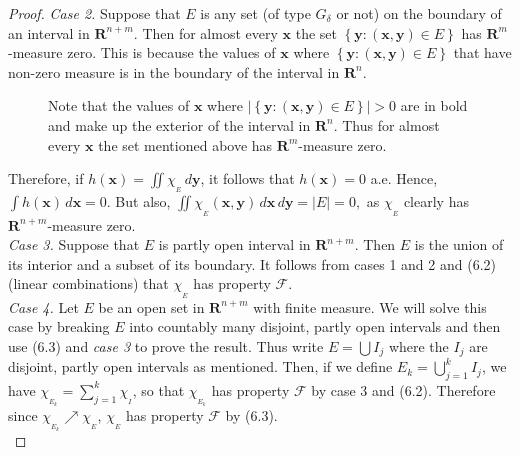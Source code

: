 \documentclass[12pt]{book}
\renewcommand{\vec}[1]{\mathbf{#1}}
\newcommand{\st}{\bf{:}}
\newcommand{\set}[1]{\left\{ #1 \right\}}
\renewcommand{\cal}[1]{\mathscr{#1}}
\newcommand{\bu}{\bigcup}
\newcommand{\ind}[1]{\chi_{_{#1}}}
\newcommand{\R}{\mathbf{R}}
\renewcommand{\.}{\mkern1mu}
\newcounter{case}
\newcommand{\abs}[1]{\left| #1 \right|}
\newcommand{\upto}{\nearrow}
\newenvironment{pf}{\begin{proof}\setlength{\parindent}{\normalparindent}\setlength{\parskip}{\normalparskip}}{\end{proof}}
\theoremstyle{theorem}
\renewcommand{\bf}[1]{\boldsymbol{#1}}
\newlength{\normalparindent}
\newlength{\normalparskip}
\begin{document}
\begin{pf}
			\textit{Case 2.} Suppose that $E$ is any set (of type $G_\delta$ or not) on the boundary of an interval in $\R^{n+m}$. Then for almost every $\vec x$ the set $\set{\vec y\st (\vec x, \vec y) \in E}$ has $\R^m$-measure zero. This is because the values of $\vec x$ where $\set{\vec y \st (\vec x, \vec y) \in E}$ that have non-zero measure is in the boundary of the interval in $\R^n$.
			\begin{SCfigure}[0.5][!h]			
				\caption{Note that the values of $\vec x$ where $\abs{\set{\vec y \st (\vec x, \vec y) \in E}} > 0$ are in bold and make up the exterior of the interval in $\R^n$. Thus for almost every $\vec x$ the set mentioned above has $\R^m$-measure zero.}
			\end{SCfigure}
		Therefore, if $h(\vec x) = \iint\ind E\, d\vec y$, it follows that $h(\vec x) = 0$ a.e. Hence, $\int h(\vec x)\, d\vec x = 0$. But also, $\iint \ind E(\vec x, \vec y)\, d\vec x\, d\vec y = \abs{E} = 0,$ as $\ind E$ clearly has $\R^{n+m}$-measure zero.\\
		
		\textit{Case 3.} Suppose that $E$ is partly open interval in $\R^{n+m}$. Then $E$ is the union of its interior and a subset of its boundary. It follows from cases 1 and 2 and (6.2) (linear combinations) that $\ind E$ has property $\cal F$.\\
		
		\textit{Case 4.} Let $E$ be an open set in $\R^{n+m}$ with finite measure. We will solve this case by breaking $E$ into countably many disjoint, partly open intervals and then use (6.3) and \textit{case 3} to prove the result. Thus write $E = \bu I_j$ where the $I_j$ are disjoint, partly open intervals as mentioned. Then, if we define $E_k = \bu_{j=1}^k I_j$, we have $\ind{E_k} = \sum_{j=1}^k \ind I$, so that $\ind{E_k}$ has property $\cal F$ by case 3 and (6.2). Therefore since $\ind{E_k} \upto \ind E$, $\ind E$ has property $\cal F$ by (6.3).\\
		

\end{pf}
\end{document}
